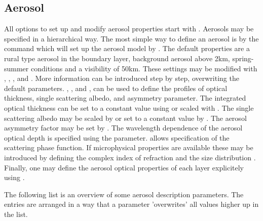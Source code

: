 \subsection{Aerosol}
All options to set up and modify aerosol properties start with
.  Aerosols may be specified in a hierarchical
way. The most simple way to define an aerosol is by the command
 which will set up the aerosol model by
\citet{shettle89}. The default properties are a rural
type aerosol in the boundary layer, background aerosol above 2km,
spring-summer conditions and a visibility of 50km. These settings may
be modified with , ,
, and . More
information can be introduced step by step, overwriting the default
parameters. , , and
, can be used to define the profiles of
optical thickness, single scattering albedo, and asymmetry
parameter. The integrated optical thickness can be set to a constant
value using  or scaled with
. The single scattering albedo may be scaled
by  or set to a constant value by
.  The aerosol asymmetry factor may be set by
. The wavelength dependence of the aerosol
optical depth is specified using the 
parameter.  allows specification of the
scattering phase function. If microphysical properties are available
these may be introduced by defining the complex index of refraction
 and the
size distribution . Finally, one may
define the aerosol optical properties of each layer explicitely using
.

The following list is an overview of some aerosol description
parameters. The entries are arranged in a way that a parameter
'overwrites' all values higher up in the list.


